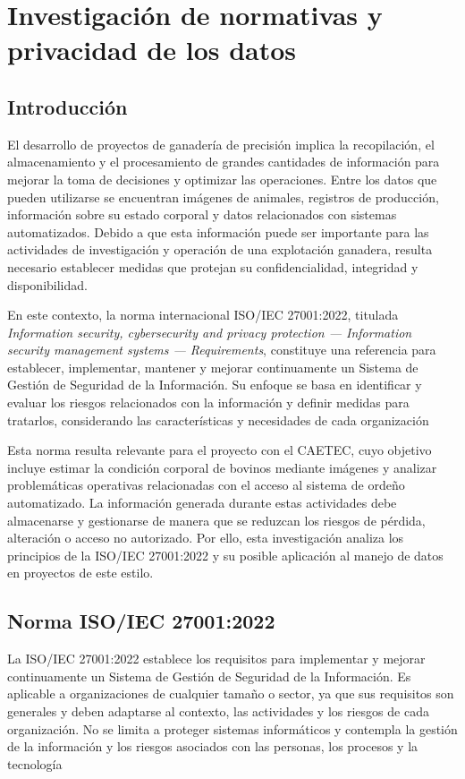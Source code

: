 \section{Investigación de normativas y privacidad de los datos}

\subsection{Introducción}

El desarrollo de proyectos de ganadería de precisión implica la recopilación, el almacenamiento y el procesamiento de grandes cantidades de información para mejorar la toma de decisiones y optimizar las operaciones. Entre los datos que pueden utilizarse se encuentran imágenes de animales, registros de producción, información sobre su estado corporal y datos relacionados con sistemas automatizados. Debido a que esta información puede ser importante para las actividades de investigación y operación de una explotación ganadera, resulta necesario establecer medidas que protejan su confidencialidad, integridad y disponibilidad.

En este contexto, la norma internacional ISO/IEC 27001:2022, titulada \emph{Information security, cybersecurity and privacy protection — Information security management systems — Requirements}, constituye una referencia para establecer, implementar, mantener y mejorar continuamente un Sistema de Gestión de Seguridad de la Información. Su enfoque se basa en identificar y evaluar los riesgos relacionados con la información y definir medidas para tratarlos, considerando las características y necesidades de cada organización

Esta norma resulta relevante para el proyecto con el CAETEC, cuyo objetivo incluye estimar la condición corporal de bovinos mediante imágenes y analizar problemáticas operativas relacionadas con el acceso al sistema de ordeño automatizado. La información generada durante estas actividades debe almacenarse y gestionarse de manera que se reduzcan los riesgos de pérdida, alteración o acceso no autorizado. Por ello, esta investigación analiza los principios de la ISO/IEC 27001:2022 y su posible aplicación al manejo de datos en proyectos de este estilo.

\subsection{Norma ISO/IEC 27001:2022}

La ISO/IEC 27001:2022 establece los requisitos para implementar y mejorar continuamente un Sistema de Gestión de Seguridad de la Información. Es aplicable a organizaciones de cualquier tamaño o sector, ya que sus requisitos son generales y deben adaptarse al contexto, las actividades y los riesgos de cada organización. No se limita a proteger sistemas informáticos y contempla la gestión de la información y los riesgos asociados con las personas, los procesos y la tecnología

